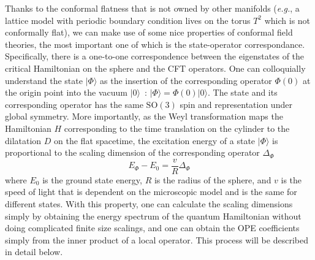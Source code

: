 \documentclass{timesjhep}
\begin{document}
Thanks to the conformal flatness that is not owned by other manifolds (\textit{e.g.}, a lattice model with periodic boundary condition lives on the torus $T^2$ which is not conformally flat), we can make use of some nice properties of conformal field theories, the most important one of which is the state-operator correspondance. Specifically, there is a one-to-one correspondence between the eigenstates of the critical Hamiltonian on the sphere and the CFT operators. One can colloquially understand the state $|\Phi\rangle$ as the insertion of the corresponding operator $\Phi(0)$ at the origin point into the vacuum $|0\rangle$~: $|\Phi\rangle=\Phi(0)|0\rangle$. The state and its corresponding operator has the same $\mathrm{SO}(3)$ spin and representation under global symmetry. More importantly, as the Weyl transformation maps the Hamiltonian $H$ corresponding to the time translation on the cylinder to the dilatation $D$ on the flat spacetime, the excitation energy of a state $|\Phi\rangle$ is proportional to the scaling dimension of the corresponding operator $\Delta_\Phi$ 
\begin{equation}
    E_\Phi-E_0=\frac{v}{R}\Delta_\Phi
\end{equation}
where $E_0$ is the ground state energy, $R$ is the radius of the sphere, and $v$ is the speed of light that is dependent on the microscopic model and is the same for different states. With this property, one can calculate the scaling dimensions simply by obtaining the energy spectrum of the quantum Hamiltonian without doing complicated finite size scalings, and one can obtain the OPE coefficients simply from the inner product of a local operator. This process will be described in detail below. 
\end{document}
